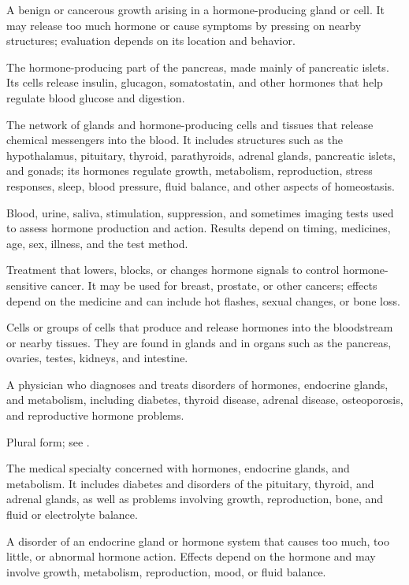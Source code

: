  A benign or cancerous growth arising in a hormone-producing gland or cell. It may release too much hormone or cause symptoms by pressing on nearby structures; evaluation depends on its location and behavior.

 The hormone-producing part of the pancreas, made mainly of pancreatic islets. Its cells release insulin, glucagon, somatostatin, and other hormones that help regulate blood glucose and digestion.

 The network of glands and hormone-producing cells and tissues that release chemical messengers into the blood. It includes structures such as the hypothalamus, pituitary, thyroid, parathyroids, adrenal glands, pancreatic islets, and gonads; its hormones regulate growth, metabolism, reproduction, stress responses, sleep, blood pressure, fluid balance, and other aspects of homeostasis.

 Blood, urine, saliva, stimulation, suppression, and sometimes imaging tests used to assess hormone production and action. Results depend on timing, medicines, age, sex, illness, and the test method.

 Treatment that lowers, blocks, or changes hormone signals to control hormone-sensitive cancer. It may be used for breast, prostate, or other cancers; effects depend on the medicine and can include hot flashes, sexual changes, or bone loss.

 Cells or groups of cells that produce and release hormones into the bloodstream or nearby tissues. They are found in glands and in organs such as the pancreas, ovaries, testes, kidneys, and intestine.

 A physician who diagnoses and treats disorders of hormones, endocrine glands, and metabolism, including diabetes, thyroid disease, adrenal disease, osteoporosis, and reproductive hormone problems.

 Plural form; see .

 The medical specialty concerned with hormones, endocrine glands, and metabolism. It includes diabetes and disorders of the pituitary, thyroid, and adrenal glands, as well as problems involving growth, reproduction, bone, and fluid or electrolyte balance.

 A disorder of an endocrine gland or hormone system that causes too much, too little, or abnormal hormone action. Effects depend on the hormone and may involve growth, metabolism, reproduction, mood, or fluid balance.


